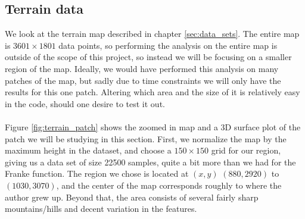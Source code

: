 \documentclass[a4paper]{article}
\begin{document}
\subsection{Terrain data}
We look at the terrain map described in chapter \ref{sec:data_sets}. The entire map is $3601\times1801$ data points, so performing the analysis on the entire map is outside of the scope of this project, so instead we will be focusing on a smaller region of the map. Ideally, we would have performed this analysis on many patches of the map, but sadly due to time constraints we will only have the results for this one patch. Altering which area and the size of it is relatively easy in the code, should one desire to test it out.\\\\
Figure \ref{fig:terrain_patch} shows the zoomed in map and a 3D surface plot of the patch we will be studying in this section. First, we normalize the map by the maximum height in the dataset, and choose a $150\times150$ grid for our region, giving us a data set of size 22500 samples, quite a bit more than we had for the Franke function. The region we chose is located at $(x,y)$ $(880, 2920)$ to $(1030, 3070)$, and the center of the map corresponds roughly to where the author grew up. Beyond that, the area consists of several fairly sharp mountains/hills and decent variation in the features.
\end{document}
